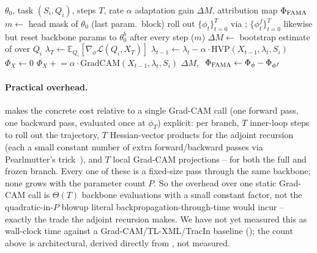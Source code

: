 \begin{algorithm}[t]
\caption{\fama}
\label{alg:fama}
\begin{algorithmic}[1]
\Require $\theta_0$, task $(S_i,Q_i)$, steps $T$, rate $\alpha$
\Ensure adaptation gain $\Delta M$, attribution map $\Phi_{\mathrm{FAMA}}$
\State $m \gets$ head mask of $\theta_0$ (last param.\ block)
\State roll out $\{\phi_t\}_{t=0}^T$ via ; $\{\phi_t^f\}_{t=0}^T$ likewise but reset backbone params to $\theta_0^b$ after every step ($m$)
\State $\Delta M \gets$ bootstrap estimate of  over $Q_i$
    \State $\lambda_T \gets \mathbb{E}_{Q_i}[\nabla_\phi \mathcal{L}(Q_i, X_T)]$ 
        \State $\lambda_{t-1} \gets \lambda_t - \alpha\cdot\mathrm{HVP}(X_{t-1}, \lambda_t, S_i)$ 
    \EndFor
    \State $\Phi_X \gets 0$
        \State $\Phi_X \mathrel{+}= \alpha \cdot \mathrm{GradCAM}(X_{t-1}, \lambda_t, S_i)$ 
    \EndFor
\EndFor
\State \Return $\Delta M$, $\ \Phi_{\mathrm{FAMA}} \gets \Phi_{\phi} - \Phi_{\phi^f}$
\end{algorithmic}
\end{algorithm}

\paragraph{Practical overhead.}  makes the concrete cost relative to a single Grad-CAM call (one forward pass, one backward pass, evaluated once at $\phi_T$) explicit: per branch, $T$ inner-loop steps to roll out the trajectory, $T$ Hessian-vector products for the adjoint recursion (each a small constant number of extra forward/backward passes via Pearlmutter's trick~\cite{pearlmutter1994fast}), and $T$ local Grad-CAM projections -- for both the full and frozen branch. Every one of these is a fixed-size pass through the same backbone; none grows with the parameter count $P$. So the overhead over one static Grad-CAM call is $\Theta(T)$ backbone evaluations with a small constant factor, not the quadratic-in-$P$ blowup literal backpropagation-through-time would incur -- exactly the trade the adjoint recursion makes. We have not yet measured this as wall-clock time against a Grad-CAM/TL-XML/TracIn baseline (); the count above is architectural, derived directly from , not measured.
